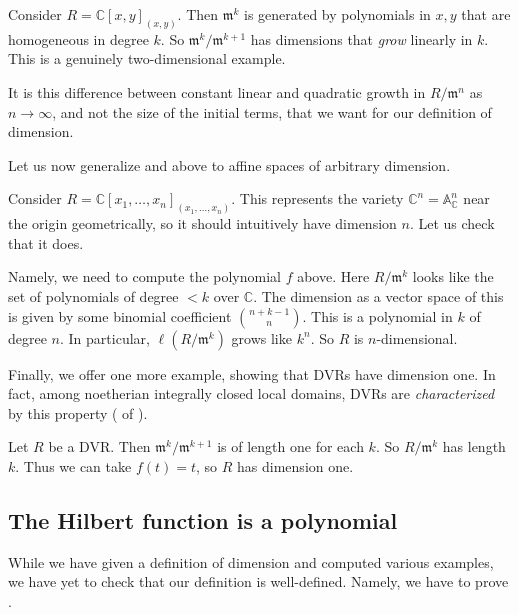 \begin{example} \label{dimaffineplane}
Consider $R = \mathbb{C}[x,y]_{(x,y)}$. Then $\mathfrak{m}^k$ is generated by
polynomials in $x,y$ that are homogeneous in degree $k$. So $\mathfrak{m}^k/\mathfrak{m}^{k+1}$
has dimensions that \emph{grow} linearly in $k$. This is a genuinely two-dimensional
example. 
\end{example} 

It is this difference between constant linear and quadratic growth in
$R/\mathfrak{m}^n$ as $n \to \infty$, and not the size of the initial terms,
that we want for our definition of dimension.

Let us now generalize  and 
above to affine spaces of arbitrary dimension. 
\begin{example} 
Consider $R = \mathbb{C}[x_1, \dots, x_n]_{(x_1, \dots, x_n)}$. 
This represents the variety $\mathbb{C}^n = \mathbb{A}^n_{\mathbb{C}}$ near the origin geometrically, so
it should intuitively have dimension $n$. Let us check that it does. 

Namely, we need to compute the polynomial $f$ above. Here $R/\mathfrak{m}^k$ looks like the set of
polynomials of degree $<k$ over $\mathbb{C}$. The dimension as a vector space
of this is
given by some binomial coefficient $\binom{n+k-1}{n}$. This is a polynomial in
$k$ of degree $n$. In particular, $\ell(R/\mathfrak{m}^k)$ grows like $k^n$.
So $R$ is $n$-dimensional. 
\end{example} 


Finally, we offer one more example, showing that DVRs have dimension one. In
fact, among noetherian integrally closed local domains, DVRs are
\emph{characterized} by this property (\rref{} of \rref{}).

\begin{example}
Let $R$ be a DVR. Then $\mathfrak{m}^k/\mathfrak{m}^{k+1}$ is of length one for
each $k$. So $R/\mathfrak{m}^k$ has length $k$. Thus we can take $f(t) = t$, so
$R$ has dimension one.
\end{example} 

\subsection{The Hilbert function is a polynomial} 

While we have given a definition of dimension and computed various examples,
we have yet to check that our definition is well-defined. 
Namely, we have to prove .

